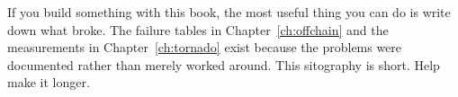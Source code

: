 \begin{highlight}
If you build something with this book, the most useful thing you can do is
write down what broke. The failure tables in Chapter~\ref{ch:offchain} and the
measurements in Chapter~\ref{ch:tornado} exist because the problems were
documented rather than merely worked around. This sitography is short. Help
make it longer.
\end{highlight}
